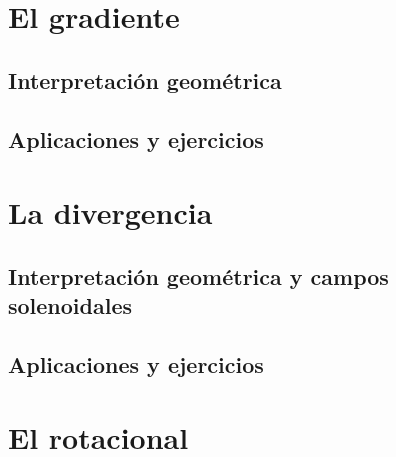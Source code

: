 \documentclass[12pt,openany]{book}
\begin{document}
	\section{El gradiente}

	   \subsection{Interpretaci\'on geom\'etrica}

	   \subsection{Aplicaciones y ejercicios}

	\section{La divergencia}

	   \subsection{Interpretaci\'on geom\'etrica y campos solenoidales}

	   \subsection{Aplicaciones y ejercicios}

	\section{El rotacional}

\end{document}
